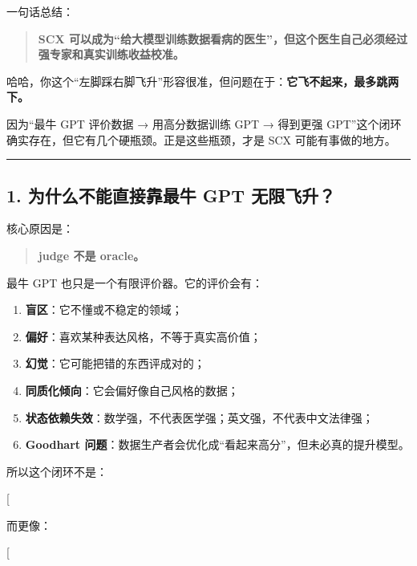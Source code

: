 \documentclass[
  12pt,
]{ctexart}
\providecommand{\tightlist}{%
  \setlength{\itemsep}{0pt}\setlength{\parskip}{0pt}}
\begin{document}
一句话总结：

\begin{quote}
\textbf{SCX
可以成为``给大模型训练数据看病的医生''，但这个医生自己必须经过强专家和真实训练收益校准。}
\end{quote}

哈哈，你这个``左脚踩右脚飞升''形容很准，但问题在于：\textbf{它飞不起来，最多跳两下。}

因为``最牛 GPT 评价数据 → 用高分数据训练 GPT → 得到更强
GPT''这个闭环确实存在，但它有几个硬瓶颈。正是这些瓶颈，才是 SCX
可能有事做的地方。

\begin{center}\rule{0.5\linewidth}{0.5pt}\end{center}

\subsection{1. 为什么不能直接靠最牛 GPT
无限飞升？}\label{ux4e3aux4ec0ux4e48ux4e0dux80fdux76f4ux63a5ux9760ux6700ux725b-gpt-ux65e0ux9650ux98deux5347}

核心原因是：

\begin{quote}
\textbf{judge 不是 oracle。}
\end{quote}

最牛 GPT 也只是一个有限评价器。它的评价会有：

\begin{enumerate}
\def\labelenumi{\arabic{enumi}.}
\tightlist
\item
  \textbf{盲区}：它不懂或不稳定的领域；
\item
  \textbf{偏好}：喜欢某种表达风格，不等于真实高价值；
\item
  \textbf{幻觉}：它可能把错的东西评成对的；
\item
  \textbf{同质化倾向}：它会偏好像自己风格的数据；
\item
  \textbf{状态依赖失效}：数学强，不代表医学强；英文强，不代表中文法律强；
\item
  \textbf{Goodhart
  问题}：数据生产者会优化成``看起来高分''，但未必真的提升模型。
\end{enumerate}

所以这个闭环不是：

{[}  \Rightarrow {}
\Rightarrow \text{better GPT}{]}

而更像：

{[}  \Rightarrow {}
\Rightarrow \text{judge-shaped model}{]}
\end{document}
